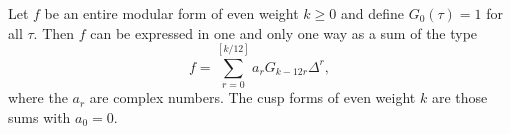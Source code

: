 Let $f$ be an entire modular form of even weight $k \geq 0$ and define $G_0(\tau) = 1$ for all $\tau$. Then $f$ can be expressed in one and only one way as a sum of the type
$$
f = \sum_{r=0}^{[k/12]} a_r G_{k-12r} \Delta^r,
$$
where the $a_r$ are complex numbers. The cusp forms of even weight $k$ are those sums with $a_0 = 0$.
